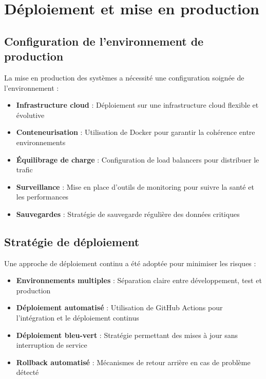 \section{Déploiement et mise en production}

\subsection{Configuration de l'environnement de production}

La mise en production des systèmes a nécessité une configuration soignée de l'environnement :

\begin{itemize}
  \item \textbf{Infrastructure cloud} : Déploiement sur une infrastructure cloud flexible et évolutive
  
  \item \textbf{Conteneurisation} : Utilisation de Docker pour garantir la cohérence entre environnements
  
  \item \textbf{Équilibrage de charge} : Configuration de load balancers pour distribuer le trafic
  
  \item \textbf{Surveillance} : Mise en place d'outils de monitoring pour suivre la santé et les performances
  
  \item \textbf{Sauvegardes} : Stratégie de sauvegarde régulière des données critiques
\end{itemize}

\subsection{Stratégie de déploiement}

Une approche de déploiement continu a été adoptée pour minimiser les risques :

\begin{itemize}
  \item \textbf{Environnements multiples} : Séparation claire entre développement, test et production
  
  \item \textbf{Déploiement automatisé} : Utilisation de GitHub Actions pour l'intégration et le déploiement continus
  
  \item \textbf{Déploiement bleu-vert} : Stratégie permettant des mises à jour sans interruption de service
  
  \item \textbf{Rollback automatisé} : Mécanismes de retour arrière en cas de problème détecté
\end{itemize}


